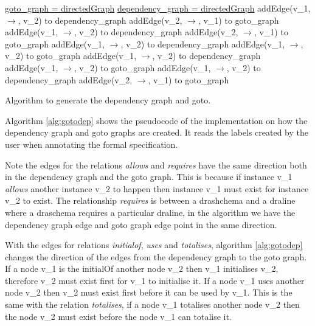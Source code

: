 \begin{algorithm}[H]
\underline{goto\_graph = directedGraph} \;
\underline{dependency\_graph = directedGraph} \;
\SetAlgoLined
{} 
{
addEdge(v\_1, $\rightarrow$, v\_2) to dependency\_graph \;
addEdge(v\_2, $\rightarrow$, v\_1)  to goto\_graph\;
}
{
addEdge(v\_1, $\rightarrow$, v\_2) to dependency\_graph \;
addEdge(v\_2, $\rightarrow$, v\_1)  to goto\_graph \;
}
{
addEdge(v\_1, $\rightarrow$, v\_2) to dependency\_graph \;
addEdge(v\_1, $\rightarrow$, v\_2)  to goto\_graph \;
}
{
addEdge(v\_1, $\rightarrow$, v\_2) to dependency\_graph \;
addEdge(v\_1, $\rightarrow$, v\_2)  to goto\_graph \;
}
{
addEdge(v\_1, $\rightarrow$, v\_2) to dependency\_graph \;
addEdge(v\_2, $\rightarrow$, v\_1)  to goto\_graph \;
}
\caption{Algorithm to generate the dependency graph and goto. \label{alg:gotodep} }
\end{algorithm}
\vspace{0.2in}


Algorithm \ref{alg:gotodep} shows the pseudocode of the implementation on how the dependency graph and goto graphs are created. It reads the labels created by the user when annotating the formal specification. 

Note the edges for the relations \emph{allows} and \emph{requires} have the same direction both in the dependency graph and the goto graph. This is because if instance v\_1 \emph{allows} another instance v\_2 to happen then instance v\_1 must exist for instance v\_2 to exist. The relationship \emph{requires} is between a drashchema and a draline where a draschema requires a particular draline, in the algorithm we have the dependency graph edge and goto graph edge point in the same direction.

With the edges for relations \emph{initialof}, \emph{uses} and \emph{totalises}, algorithm \ref{alg:gotodep} changes the direction of the edges from the dependency graph to the goto graph. If a node v\_1 is the initialOf another node v\_2 then v\_1 initialises v\_2, therefore v\_2 must exist first for v\_1 to initialise it. If a node v\_1 uses another node v\_2 then v\_2 must exist first before it can be used by v\_1. This is the same with the relation \emph{totalises}, if a node v\_1 totalises another node v\_2 then the node v\_2 must exist before the node v\_1 can totalise it.

